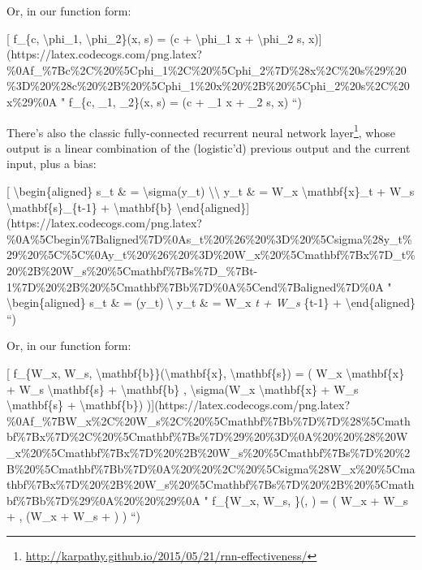 \documentclass[]{article}
\renewcommand{\href}[2]{#2\footnote{\url{#1}}}
\begin{document}
Or, in our function form:

{[} f\_\{c, \textbackslash{}phi\_1, \textbackslash{}phi\_2\}(x, s) = (c +
\textbackslash{}phi\_1 x + \textbackslash{}phi\_2 s,
x){]}(https://latex.codecogs.com/png.latex?\%0Af\_\%7Bc\%2C\%20\%5Cphi\_1\%2C\%20\%5Cphi\_2\%7D\%28x\%2C\%20s\%29\%20\%3D\%20\%28c\%20\%2B\%20\%5Cphi\_1\%20x\%20\%2B\%20\%5Cphi\_2\%20s\%2C\%20x\%29\%0A
" f\_\{c, \phi\_1, \phi\_2\}(x, s) = (c + \phi\_1 x + \phi\_2 s, x) ``)

There's also the classic
\href{http://karpathy.github.io/2015/05/21/rnn-effectiveness/}{fully-connected
recurrent neural network layer}, whose output is a linear combination of the
(logistic'd) previous output and the current input, plus a bias:

{[} \textbackslash{}begin\{aligned\} s\_t \& = \textbackslash{}sigma(y\_t)
\textbackslash{}\textbackslash{} y\_t \& = W\_x \textbackslash{}mathbf\{x\}\_t +
W\_s \textbackslash{}mathbf\{s\}\_\{t-1\} + \textbackslash{}mathbf\{b\}
\textbackslash{}end\{aligned\}{]}(https://latex.codecogs.com/png.latex?\%0A\%5Cbegin\%7Baligned\%7D\%0As\_t\%20\%26\%20\%3D\%20\%5Csigma\%28y\_t\%29\%20\%5C\%5C\%0Ay\_t\%20\%26\%20\%3D\%20W\_x\%20\%5Cmathbf\%7Bx\%7D\_t\%20\%2B\%20W\_s\%20\%5Cmathbf\%7Bs\%7D\_\%7Bt-1\%7D\%20\%2B\%20\%5Cmathbf\%7Bb\%7D\%0A\%5Cend\%7Baligned\%7D\%0A
" \textbackslash{}begin\{aligned\} s\_t \& = \sigma(y\_t) \textbackslash{} y\_t
\& = W\_x \emph{t + W\_s }\{t-1\} + 
\textbackslash{}end\{aligned\} ``)

Or, in our function form:

{[} f\_\{W\_x, W\_s, \textbackslash{}mathbf\{b\}\}(\textbackslash{}mathbf\{x\},
\textbackslash{}mathbf\{s\}) = ( W\_x \textbackslash{}mathbf\{x\} + W\_s
\textbackslash{}mathbf\{s\} + \textbackslash{}mathbf\{b\} ,
\textbackslash{}sigma(W\_x \textbackslash{}mathbf\{x\} + W\_s
\textbackslash{}mathbf\{s\} + \textbackslash{}mathbf\{b\})
){]}(https://latex.codecogs.com/png.latex?\%0Af\_\%7BW\_x\%2C\%20W\_s\%2C\%20\%5Cmathbf\%7Bb\%7D\%7D\%28\%5Cmathbf\%7Bx\%7D\%2C\%20\%5Cmathbf\%7Bs\%7D\%29\%20\%3D\%0A\%20\%20\%28\%20W\_x\%20\%5Cmathbf\%7Bx\%7D\%20\%2B\%20W\_s\%20\%5Cmathbf\%7Bs\%7D\%20\%2B\%20\%5Cmathbf\%7Bb\%7D\%0A\%20\%20\%2C\%20\%5Csigma\%28W\_x\%20\%5Cmathbf\%7Bx\%7D\%20\%2B\%20W\_s\%20\%5Cmathbf\%7Bs\%7D\%20\%2B\%20\%5Cmathbf\%7Bb\%7D\%29\%0A\%20\%20\%29\%0A
" f\_\{W\_x, W\_s, \}(, ) = ( W\_x  +
W\_s  +  , \sigma(W\_x  + W\_s  +
) ) ``)
\end{document}
